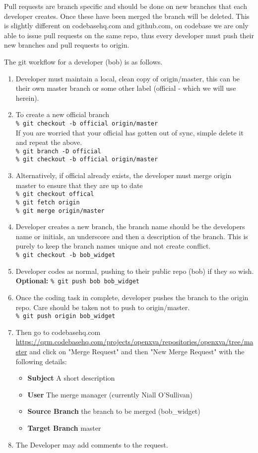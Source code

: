 \documentclass[12pt, a4paper]{article}
\begin{document}
Pull requests are branch specific and should be done on new branches that each developer creates. Once these have been merged the branch will be deleted. This is slightly different on codebasehq.com and github.com, on codebase we are only able to issue pull requests on the same repo, thus every developer must push their new branches and pull requests to origin.

The git workflow for a developer (bob) is as follows.
\begin{enumerate}
\item Developer must maintain a local, clean copy of origin/master, this can be their own master branch or some other label (official - which we will use herein).
\item To create a new official branch \\
 \texttt{\% git checkout -b official origin/master} \\
 If you are worried that your official has gotten out of sync, simple delete it and repeat the above.\\
 \texttt{\% git branch -D official} \\
 \texttt{\% git checkout -b official origin/master}
\item Alternatively, if official already exists, the developer must merge origin master to ensure that they are up to date\\
 \texttt{\% git checkout offical} \\
 \texttt{\% git fetch origin} \\
 \texttt{\% git merge origin/master} \\
\item Developer creates a new branch, the branch name should be the developers name or initials, an underscore and then a description of the branch. This is purely to keep the branch names unique and not create conflict.\\
 \texttt{\% git checkout -b bob\_widget}
\item Developer codes as normal, pushing to their public repo (bob) if they so wish.\\
\textbf{Optional:} \texttt{\% git push bob bob\_widget}
\item Once the coding task in complete, developer pushes the branch to the origin repo. Care should be taken not to push to origin/master.\\
 \texttt{\% git push origin bob\_widget}
 \item Then go to codebasehq.com \url{https://qrm.codebasehq.com/projects/openxva/repositories/openxva/tree/master} and click on "Merge Request" and then "New Merge Request" with the following details:
 \begin{itemize}
 \item \textbf{Subject} A short description
 \item \textbf{User} The merge manager (currently Niall O'Sullivan)
 \item \textbf{Source Branch} the branch to be merged (bob\_widget)
 \item \textbf{Target Branch} master
 \end{itemize}
\item The Developer may add comments to the request.
\end{enumerate}
\end{document}
